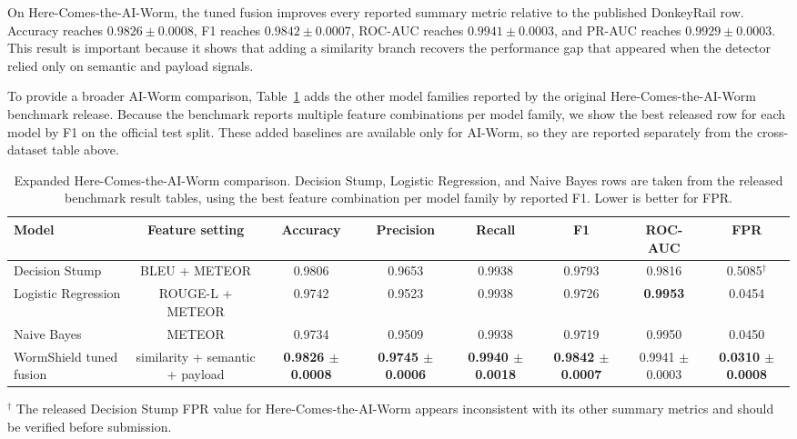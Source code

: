 On Here-Comes-the-AI-Worm, the tuned fusion improves every reported
summary metric relative to the published DonkeyRail row. Accuracy
reaches $0.9826 \pm 0.0008$, F1 reaches
$0.9842 \pm 0.0007$, ROC-AUC reaches
$0.9941 \pm 0.0003$, and PR-AUC reaches
$0.9929 \pm 0.0003$. This result is important because it shows
that adding a similarity branch recovers the performance gap that
appeared when the detector relied only on semantic and payload
signals.

To provide a broader AI-Worm comparison, Table~\ref{tab:aiworm-expanded}
adds the other model families reported by the original
Here-Comes-the-AI-Worm benchmark release. Because the benchmark
reports multiple feature combinations per model family, we show the
best released row for each model by F1 on the official test split.
These added baselines are available only for AI-Worm, so they are
reported separately from the cross-dataset table above.

\begin{table}[t]
\centering
\small
\setlength{\tabcolsep}{4pt}
\caption{Expanded Here-Comes-the-AI-Worm comparison. Decision
Stump, Logistic Regression, and Naive Bayes rows are taken from the
released benchmark result tables, using the best feature combination
per model family by reported F1. Lower is better for FPR.}
\label{tab:aiworm-expanded}
\begin{tabular}{lccccccc}
\toprule
Model & Feature setting & Accuracy & Precision & Recall & F1 & ROC-AUC & FPR \\
\midrule
Decision Stump & BLEU + METEOR
& 0.9806
& 0.9653
& 0.9938
& 0.9793
& 0.9816
& 0.5085$^{\dagger}$ \\
Logistic Regression & ROUGE-L + METEOR
& 0.9742
& 0.9523
& 0.9938
& 0.9726
& \textbf{0.9953}
& 0.0454 \\
Naive Bayes & METEOR
& 0.9734
& 0.9509
& 0.9938
& 0.9719
& 0.9950
& 0.0450 \\
WormShield tuned fusion & similarity + semantic + payload
& \textbf{0.9826 $\pm$ 0.0008}
& \textbf{0.9745 $\pm$ 0.0006}
& \textbf{0.9940 $\pm$ 0.0018}
& \textbf{0.9842 $\pm$ 0.0007}
& 0.9941 $\pm$ 0.0003
& \textbf{0.0310 $\pm$ 0.0008} \\
\bottomrule
\end{tabular}

\vspace{1mm}
\parbox{0.97\textwidth}{\footnotesize
$^{\dagger}$ The released Decision Stump FPR value for
Here-Comes-the-AI-Worm appears inconsistent with its other summary
metrics and should be verified before submission.}
\end{table}

